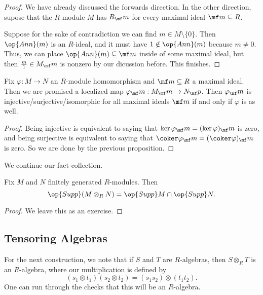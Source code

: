 \begin{proof}
	We have already discussed the forwards direction. In the other direction, supose that the $R$-module $M$ has $R_\mf m$ for every maximal ideal $\mf m\subseteq R$.

	Suppose for the sake of contradiction we can find $m\in M\setminus\{0\}$. Then $\op{Ann}(m)$ is an $R$-ideal, and it must have $1\notin\op{Ann}(m)$ because $m\ne0$. Thus, we can place $\op{Ann}(m)\subseteq\mf m$ inside of some maximal ideal, but then $\frac m1\in M_\mf m$ is nonzero by our dicussion before. This finishes.
\end{proof}
\begin{corollary}
	Fix $\varphi:M\to N$ an $R$-module homomorphism and $\mf m\subseteq R$ a maximal ideal. Then we are promised a localized map $\varphi_\mf m:M_\mf m\to N_\mf p$. Then $\varphi_\mf m$ is injective/surjective/isomorphic for all maximal ideals $\mf m$ if and only if $\varphi$ is as well.
\end{corollary}
\begin{proof}
	Being injective is equivalent to saying that $\ker\varphi_\mf m=(\ker\varphi)_\mf m$ is zero, and being surjective is equivalent to saying that $\coker\varphi_\mf m=(\coker\varphi)_\mf m$ is zero. So we are done by the previous proposition.
\end{proof}
We continue our fact-collection.
\begin{proposition}
	Fix $M$ and $N$ finitely generated $R$-modules. Then
	\[\op{Supp}(M\otimes_RN)=\op{Supp}M\cap\op{Supp}N.\]
\end{proposition}
\begin{proof}
	We leave this as an exercise.
\end{proof}

\subsection{Tensoring Algebras}
For the next construction, we note that if $S$ and $T$ are $R$-algebras, then $S\otimes_RT$ is an $R$-algebra, where our multiplication is defined by
\[(s_1\otimes t_1)(s_2\otimes t_2)=(s_1s_2)\otimes(t_1t_2).\]
One can run through the checks that this will be an $R$-algebra.

